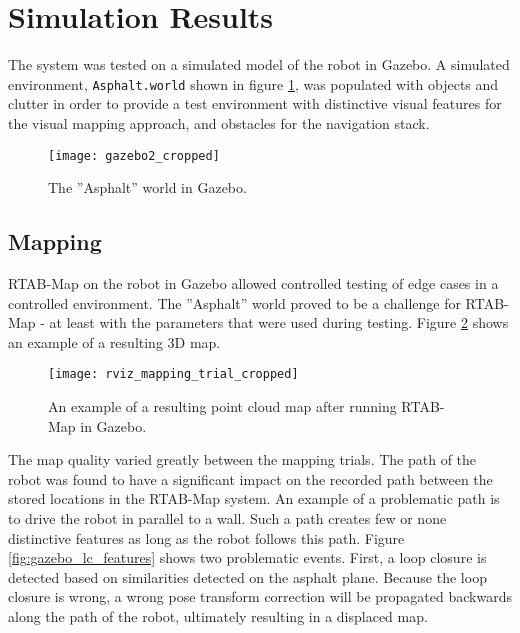 \section{Simulation Results}

The system was tested on a simulated model of the robot in Gazebo. A simulated environment, \texttt{Asphalt.world} shown in figure \ref{fig:gazebo2_cropped}, was populated with objects and clutter in order to provide a test environment with distinctive visual features for the visual mapping approach, and obstacles for the navigation stack. 

\begin{figure}[h]
	\centering
	\texttt{[image: gazebo2\_cropped]}
	\caption{The ''Asphalt'' world in Gazebo. }
	\label{fig:gazebo2_cropped}
\end{figure}

\subsection{Mapping}

\ac{RTAB-Map} on the robot in Gazebo allowed controlled testing of edge cases in a controlled environment. The ''Asphalt'' world proved to be a challenge for \ac{RTAB-Map} - at least with the parameters that were used during testing. Figure \ref{fig:rviz_mapping_trial} shows an example of a resulting 3D map. 

\begin{figure}[h]
	\centering
	\texttt{[image: rviz\_mapping\_trial\_cropped]}
	\caption{An example of a resulting point cloud map after running \ac{RTAB-Map} in Gazebo. }
	\label{fig:rviz_mapping_trial}
\end{figure}

The map quality varied greatly between the mapping trials. The path of the robot was found to have a significant impact on the recorded path between the stored locations in the \ac{RTAB-Map} system. An example of a problematic path is to drive the robot in parallel to a wall. Such a path creates few or none distinctive features as long as the robot follows this path. Figure \ref{fig:gazebo_lc_features} shows two problematic events. First, a loop closure is detected based on similarities detected on the asphalt plane. Because the loop closure is wrong, a wrong pose transform correction will be propagated backwards along the path of the robot, ultimately resulting in a displaced map.

